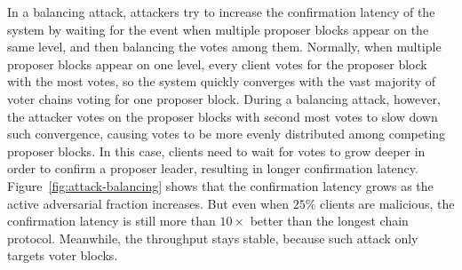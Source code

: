 In a balancing attack, attackers try to increase the confirmation latency of the system by waiting for the event when multiple proposer blocks appear on the same level, and then balancing the votes among them. Normally, when multiple proposer blocks appear on one level, every client votes for the proposer block with the most votes, so the system quickly converges with the vast majority of voter chains voting for one proposer block. During a balancing attack, however, the attacker votes on the proposer blocks with second most votes to slow down such convergence, causing votes to be more evenly distributed among competing proposer blocks. In this case, clients need to wait for votes to grow deeper in order to confirm a proposer leader, resulting in longer confirmation latency. Figure~\ref{fig:attack-balancing} shows that the confirmation latency grows as the active adversarial fraction increases. But even when $25\%$ clients are malicious, the confirmation latency is still more than $10\times$ better than the longest chain protocol. Meanwhile, the throughput stays stable, because such attack only targets voter blocks.

